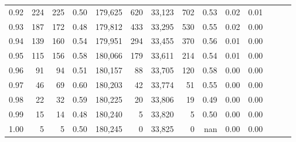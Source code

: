 \begin{tabular}{rrrrrrrrrrrrrr}
0.92 &    224 &  225 &  0.50 &  179,625 &      620 &  33,123 &     702 &  0.53 &  0.02 &      0.01 \\
0.93 &    187 &  172 &  0.48 &  179,812 &      433 &  33,295 &     530 &  0.55 &  0.02 &      0.00 \\
0.94 &    139 &  160 &  0.54 &  179,951 &      294 &  33,455 &     370 &  0.56 &  0.01 &      0.00 \\
0.95 &    115 &  156 &  0.58 &  180,066 &      179 &  33,611 &     214 &  0.54 &  0.01 &      0.00 \\
0.96 &     91 &   94 &  0.51 &  180,157 &       88 &  33,705 &     120 &  0.58 &  0.00 &      0.00 \\
0.97 &     46 &   69 &  0.60 &  180,203 &       42 &  33,774 &      51 &  0.55 &  0.00 &      0.00 \\
0.98 &     22 &   32 &  0.59 &  180,225 &       20 &  33,806 &      19 &  0.49 &  0.00 &      0.00 \\
0.99 &     15 &   14 &  0.48 &  180,240 &        5 &  33,820 &       5 &  0.50 &  0.00 &      0.00 \\
1.00 &      5 &    5 &  0.50 &  180,245 &        0 &  33,825 &       0 &   nan &  0.00 &      0.00 \\
\bottomrule
\end{tabular}
